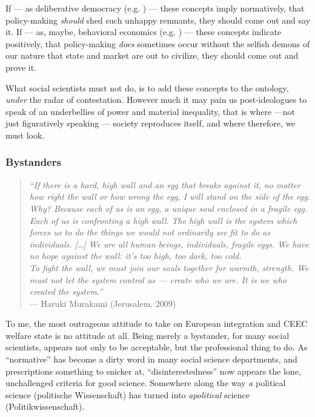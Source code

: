 \documentclass[11pt,a4paper,oneside,openright]{article}
\begin{document}
If --- as deliberative democracy (e.g. \citealt{Elster-1998-aa}) --- these concepts imply normatively, that policy-making \emph{should} shed such unhappy remnants, they should come out and say it. If --- as, maybe, behavioral economics (e.g. \citealt{Tomasello2009}) --- these concepts indicate positively, that policy-making \emph{does} sometimes occur without the selfish demons of our nature that state and market are out to civilize, they should come out and prove it. 

What social scientists must not do, is to add these concepts to the ontology, \emph{under} the radar of contestation. However much it may pain us post-ideologues to speak of \citeauthor{Agnoli-1989-aa}an underbellies of power and material inequality, that is where ---not just figuratively speaking --- society reproduces itself, and where therefore, we must look.

\subsubsection{Bystanders}

\begin{quote}
	\emph{``If there is a hard, high wall and an egg that breaks against it, no matter how right the wall or how wrong the egg, I will stand on the side of the egg. \\
	Why? Because each of us is an egg, a unique soul enclosed in a fragile egg. Each of us is confronting a high wall. The high wall is the system which forces us to do the things we would not ordinarily see fit to do as individuals. [\ldots] We are all human beings, individuals, fragile eggs. We have no hope against the wall: it's too high, too dark, too cold. \\
	To fight the wall, we must join our souls together for warmth, strength. We must not let the system control us --- create who we are. It is we who created the system.''}\\
	--- Haruki Murakami (Jerusalem, 2009)
\end{quote}

To me, the most outrageous attitude to take on European integration and \gls{CEEC} welfare state is no attitude at all. Being merely a bystander, for many social scientists, appears not only to be acceptable, but the professional thing to do. As ``normative'' has become a dirty word in many social science departments, and prescriptions something to snicker at, ``disinterestedness'' now appears the lone, unchallenged criteria for good science. Somewhere along the way \emph{a} political science (politische Wissenschaft) has turned into \emph{apolitical} science (Politikwissenschaft).
\end{document}

